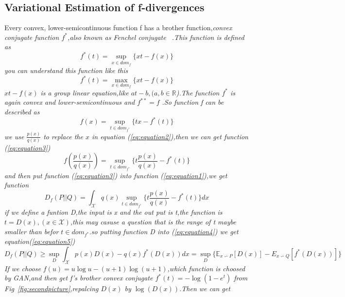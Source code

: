 \documentclass[10pt,letterpaper]{article}
\begin{document}
\subsection{Variational Estimation of f-divergences}
Every convex, lower-semicontinuous function f has a brother function,\itshape convex conjugate  \upshape function $f^{*}$,also known as Fenchel conjugate ~\cite{Fundamentals_2012_5}.This function is defined as
\begin{equation}
f^{*}(t) = \sup_{x\in{dom_{f}}}\{xt-f(x)\}
\end{equation}
you can understand this function like this
\begin{equation}
f^{*}(t) = \max_{x\in{dom_{f}}}\{xt-f(x)\}
\end{equation}
$xt-f(x)$ is a group linear equation,like $at-b,(a,b \in{\mathbb R}$).The function $f^{*}$ is again convex and lower-semicontinuous and $f^{**} = f$ .So function f can be described as
\begin{equation}
f(x) = \sup_{t\in{dom_{f^{*}}}}\{tx-f^{*}(t)\}
\label{eq:equation2}
\end{equation}
we use $\frac{p(x)}{q(x)}$ to replace the $x$ in equation (\ref{eq:equation2}),then we can get function (\ref{eq:equation3})
\begin{equation}
f(\frac{p(x)}{q(x)}) = \sup_{t\in{dom_{f^{*}}}}\{t\frac{p(x)}{q(x)} - f^{*}(t) \}
\label{eq:equation3}
\end{equation}
and then put function (\ref{eq:equation3}) into function (\ref{eq:equation1}),we get function
\begin{equation}
D_{f}(P||Q)=\int_{\mathcal{X}} q(x)\sup_{t\in{dom_{f^{*}}}}\{t\frac{p(x)}{q(x)} - f^{*}(t) \} dx
\label{eq:equation4}
\end{equation}
if we define a funtion D,the input is x and the out put is t,the function is $t=D(x),(x\in{\mathcal{X}})$,this may casuse a question that is the range of t maybe smaller than befor $t \in{dom_{f^{*}}}$.so putting function D into (\ref{eq:equation4}) we get equation(\ref{eq:equation5})
\begin{equation}
D_{f}(P||Q) \geqslant \sup_{D}\int_{\mathcal{X}} p(x)D(x) - q(x)f^{*}(D(x)) dx =
\sup_{D}\{ \mathbb E_{x \backsim P}\left[D(x)\right] - E_{x \backsim Q}\left[f^{*}(D(x))\right]\}
\label{eq:equation5}
\end{equation}
If we choose $f(u) = u\log{u} - (u+1)\log{(u+1)}$,which function is choosed by GAN,and then get f's brother convex conjugate  $f^{*}(t) = -\log{(1-e^{t})}$ from Fig~\ref{fig:secondpicture},repalcing $D(x)$ by $\log(D(x))$.Then we can get 
\end{document}
